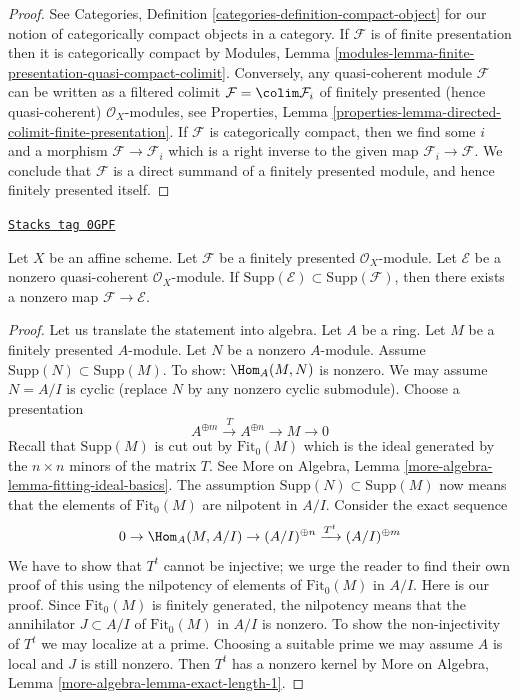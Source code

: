 \begin{proof}
See Categories, Definition \ref{categories-definition-compact-object}
for our notion of categorically compact objects in a category.
If $\mathcal{F}$ is of finite presentation then it is categorically compact by
Modules, Lemma \ref{modules-lemma-finite-presentation-quasi-compact-colimit}.
Conversely, any quasi-coherent module $\mathcal{F}$ can be written
as a filtered colimit $\mathcal{F} = \colim \mathcal{F}_i$ of
finitely presented (hence quasi-coherent)
$\mathcal{O}_X$-modules, see Properties, Lemma
\ref{properties-lemma-directed-colimit-finite-presentation}.
If $\mathcal{F}$ is categorically compact, then we find
some $i$ and a morphism $\mathcal{F} \to \mathcal{F}_i$
which is a right inverse to the given map $\mathcal{F}_i \to \mathcal{F}$.
We conclude that $\mathcal{F}$ is a direct summand of a
finitely presented module, and hence finitely presented itself.
\end{proof}

\begin{lemma}
\label{functors-lemma-supported-on-support-pre}
\href{https://stacks.math.columbia.edu/tag/0GPF}{\texttt{Stacks tag 0GPF}}

Let $X$ be an affine scheme. Let $\mathcal{F}$ be a finitely presented
$\mathcal{O}_X$-module. Let $\mathcal{E}$ be a nonzero quasi-coherent
$\mathcal{O}_X$-module. If
$\text{Supp}(\mathcal{E}) \subset \text{Supp}(\mathcal{F})$,
then there exists a nonzero map $\mathcal{F} \to \mathcal{E}$.
\end{lemma}

\begin{proof}
Let us translate the statement into algebra. Let $A$ be a ring. Let $M$ be a
finitely presented $A$-module. Let $N$ be a nonzero $A$-module. Assume
$\text{Supp}(N) \subset \text{Supp}(M)$. To show: $\Hom_A(M, N)$ is nonzero.
We may assume $N = A/I$ is cyclic (replace $N$ by any nonzero
cyclic submodule). Choose a presentation
$$
A^{\oplus m} \xrightarrow{T} A^{\oplus n} \to M \to 0
$$
Recall that $\text{Supp}(M)$ is cut out by $\text{Fit}_0(M)$ which
is the ideal generated by the $n \times n$ minors of the matrix $T$.
See More on Algebra, Lemma \ref{more-algebra-lemma-fitting-ideal-basics}.
The assumption $\text{Supp}(N) \subset \text{Supp}(M)$ now means that
the elements of $\text{Fit}_0(M)$ are nilpotent in $A/I$.
Consider the exact sequence
$$
0 \to \Hom_A(M, A/I) \to (A/I)^{\oplus n} \xrightarrow{T^t} (A/I)^{\oplus m}
$$
We have to show that $T^t$ cannot be injective; we urge the reader to
find their own proof of this using the nilpotency of elements of
$\text{Fit}_0(M)$ in $A/I$. Here is our proof.
Since $\text{Fit}_0(M)$ is finitely generated, the nilpotency means that
the annihilator $J \subset A/I$ of $\text{Fit}_0(M)$ in $A/I$ is nonzero.
To show the non-injectivity of $T^t$ we may localize at a prime.
Choosing a suitable prime we may assume $A$ is local and $J$ is still
nonzero. Then $T^t$ has a nonzero kernel by
More on Algebra, Lemma \ref{more-algebra-lemma-exact-length-1}.
\end{proof}

